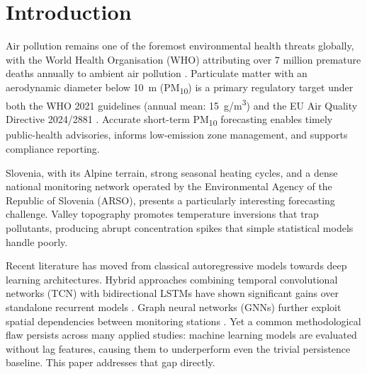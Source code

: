 \documentclass[runningheads]{llncs}
\begin{document}
\section{Introduction}

Air pollution remains one of the foremost environmental health threats
globally, with the World Health Organisation (WHO) attributing over 7
million premature deaths annually to ambient air pollution
\cite{ref_who2021}. Particulate matter with an aerodynamic diameter
below 10~\textmu{}m (PM\textsubscript{10}) is a primary regulatory
target under both the WHO 2021 guidelines (annual mean:
15~\textmu{}g/m\textsuperscript{3}) and the EU Air Quality Directive
2024/2881 \cite{ref_eu2024}. Accurate short-term PM\textsubscript{10}
forecasting enables timely public-health advisories, informs low-emission
zone management, and supports compliance reporting.

Slovenia, with its Alpine terrain, strong seasonal heating cycles, and
a dense national monitoring network operated by the Environmental Agency
of the Republic of Slovenia (ARSO), presents a particularly interesting
forecasting challenge. Valley topography promotes temperature inversions
that trap pollutants, producing abrupt concentration spikes that
simple statistical models handle poorly.

Recent literature has moved from classical autoregressive models towards
deep learning architectures. Hybrid approaches combining temporal
convolutional networks (TCN) with bidirectional LSTMs have shown
significant gains over standalone recurrent models \cite{ref_tcn_bilstm}.
Graph neural networks (GNNs) further exploit spatial dependencies between
monitoring stations \cite{ref_stgnn_pm25,ref_stgnn_madrid,ref_stgraph_beijing}.
Yet a common methodological flaw persists across many applied studies:
machine learning models are evaluated without lag features, causing them to
underperform even the trivial persistence baseline. This paper addresses
that gap directly.
\end{document}
